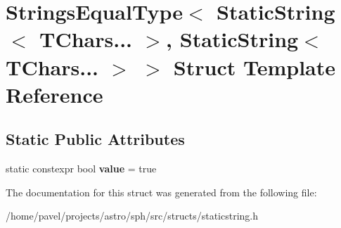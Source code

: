 \hypertarget{structStringsEqualType_3_01StaticString_3_01TChars_8_8_8_01_4_00_01StaticString_3_01TChars_8_8_8_01_4_01_4}{}\section{Strings\+Equal\+Type$<$ Static\+String$<$ T\+Chars... $>$, Static\+String$<$ T\+Chars... $>$ $>$ Struct Template Reference}
\label{structStringsEqualType_3_01StaticString_3_01TChars_8_8_8_01_4_00_01StaticString_3_01TChars_8_8_8_01_4_01_4}
\subsection*{Static Public Attributes}
\begin{DoxyCompactItemize}
\item 
\hypertarget{structStringsEqualType_3_01StaticString_3_01TChars_8_8_8_01_4_00_01StaticString_3_01TChars_8_8_8_01_4_01_4_ace530bba7f8b7c70b6d593deafccb3c4}{}\label{structStringsEqualType_3_01StaticString_3_01TChars_8_8_8_01_4_00_01StaticString_3_01TChars_8_8_8_01_4_01_4_ace530bba7f8b7c70b6d593deafccb3c4} 
static constexpr bool {\bfseries value} = true
\end{DoxyCompactItemize}


The documentation for this struct was generated from the following file\+:\begin{DoxyCompactItemize}
\item 
/home/pavel/projects/astro/sph/src/structs/staticstring.\+h\end{DoxyCompactItemize}
